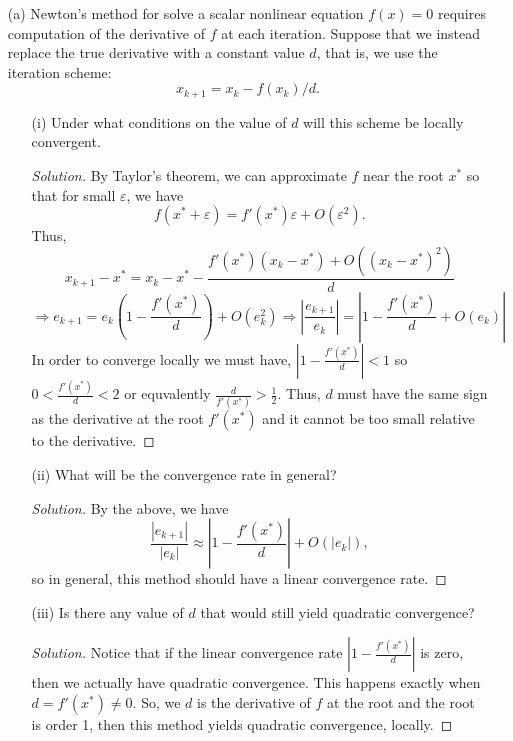 \documentclass[10pt]{article}
\newcommand{\eps}{\varepsilon}
\begin{document}
\begin{enumerate}

\item[(a)] Newton's method for solve a scalar nonlinear equation $f(x) = 0$ requires computation of the derivative of $f$ at each iteration. Suppose that we instead replace the true derivative with a constant value $ d $, that is, we use the iteration scheme: $$
x_{k+1} = x_k - f(x_k)/d.
$$ 

\begin{enumerate}
\item[(i)] Under what conditions on the value of $d$ will this scheme be locally convergent.

\begin{proof}[Solution]
By Taylor's theorem, we can approximate $f$ near the root $x^*$ so that for small $ \eps $, we have $$
f(x^* + \eps) = f'(x^*) \eps + O(\eps^2).
$$ Thus, $$
x_{k+1} - x^* = x_k - x^* - \frac{f'(x^*) (x_k - x^*) + O((x_k - x^*)^2)}{d} $$ $$\Rightarrow e_{k+1} = e_{k} \left( 1 - \frac{f'(x^*)}{d} \right) + O(e_{k}^2) \Rightarrow \left| \frac{e_{k+1}}{e_k} \right| = \left|  1 - \frac{f'(x^*)}{d} + O( e_k ) \right| $$ In order to converge locally we must have, $ \left| 1 - \frac{f'(x^*)}{d} \right| < 1 $ so $ 0 < \frac{f'(x^*)}{d} < 2 $ or equvalently $ \frac{d}{f'(x^*)} > \frac{1}{2} $. Thus, $d$ must have the same sign as the derivative at the root $ f'(x^*) $ and it cannot be too small relative to the derivative.
\end{proof}

\item[(ii)] What will be the convergence rate in general?

\begin{proof}[Solution]
By the above, we have $$
\frac{|e_{k+1}|}{|e_k|} \approx \left| 1 - \frac{f'(x^*)}{d} \right| + O(|e_k|),
$$ so in general, this method should have a linear convergence rate.
\end{proof}

\item[(iii)] Is there any value of $d$ that would still yield quadratic convergence?

\begin{proof}[Solution]
Notice that if the linear convergence rate $ \left| 1 - \frac{f'(x^*)}{d} \right| $ is zero, then we actually have quadratic convergence. This happens exactly when $ d = f'(x^*) \neq 0 $. So, we $d$ is the derivative of $f$ at the root and the root is order 1, then this method yields quadratic convergence, locally.
\end{proof}


\end{enumerate}
\end{enumerate}
\end{document}
